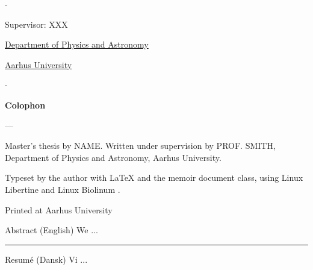 \begin{titlingpage}
\begin{adjustwidth*}{\frontpagecorrection-2cm}{-\frontpagecorrection-2cm}
    \bigskip

    \fontsize{14pt}{18pt}\selectfont
    \par
    \par

    \vfill

    Supervisor: XXX \par

    \vfill

    \fontsize{12pt}{14.5pt}\selectfont
    \href{https://www.math.au.dk/}{Department of Physics and Astronomy}\par
    \href{https://www.au.dk/}{Aarhus University}

  \end{adjustwidth*}

  \newpage
  \begin{adjustwidth*}{\frontpagecorrection}{-\frontpagecorrection}
    \thispagestyle{empty}
    \strut\vfill
    {
      \setlength{\parindent}{0pt}
      \addtolength{\parskip}{.6em}

      \begin{center}
        \bfseries\sffamily Colophon
      \end{center}

      \small

      \textsl{\projecttitle}

      {--- \textsl{\projecttitledanish}}

      \smallskip

      Master's thesis by NAME. Written under supervision by PROF. SMITH,
      Department of Physics and Astronomy, Aarhus University.

      Typeset by the author with \LaTeX{} and the \textsf{memoir} document class,
      using Linux Libertine and Linux Biolinum {\fontandleading}.

      Printed at Aarhus University
    }
  \end{adjustwidth*}
\end{titlingpage}


\thispagestyle{chapter}

\begin{multiabstract}{Abstract (English)} 
\noindent We ...

\end{multiabstract}


\plainbreak{2}

\begin{multiabstract}{Resumé (Dansk)}
\noindent Vi ...

\end{multiabstract}

